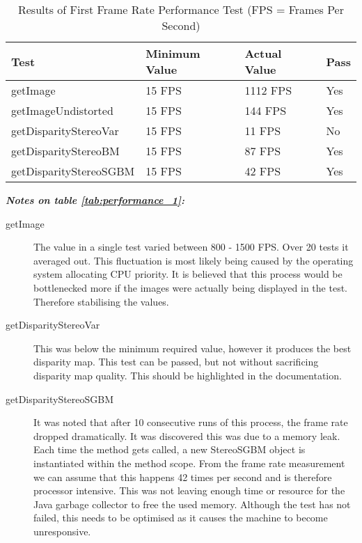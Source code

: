 \begin{table}[h]
\centering
\small
\begin{tabular}{llll}
\hline
\textbf{Test} & \textbf{Minimum Value} & \textbf{Actual Value} & \textbf{Pass}
\\ \hline
getImage                  & 15 FPS                 & 1112 FPS            & Yes           \\ 
getImageUndistorted       & 15 FPS                 & 144 FPS             & Yes           \\ 
getDisparityStereoVar     & 15 FPS                 & 11 FPS              & No            \\ 
getDisparityStereoBM      & 15 FPS                 & 87 FPS              & Yes           \\ 
getDisparityStereoSGBM    & 15 FPS                 & 42 FPS              & Yes           \\ \hline
\end{tabular}
\caption{Results of First Frame Rate Performance Test (FPS = Frames Per Second)\protect {\label{tab:performance_1}}}
\end{table}

\textbf{\textit{Notes on table \ref{tab:performance_1}:}}
\begin{description}
	\item[getImage] The value in a single test varied between 800 - 1500 FPS.
	Over 20 tests it averaged out.
	This fluctuation is most likely being caused by the operating system allocating CPU priority.
	It is believed that this process would be bottlenecked more if the images were actually being displayed in the test.
	Therefore stabilising the values.
	\item[getDisparityStereoVar] This was below the minimum required value, however it produces the best disparity map.
	This test can be passed, but not without sacrificing disparity map quality.
	This should be highlighted in the documentation.
	\item[getDisparityStereoSGBM] It was noted that after 10 consecutive runs of this process, the frame rate dropped dramatically.
	It was discovered this was due to a memory leak.
	Each time the method  gets called, a new StereoSGBM object is instantiated within the method scope. From the frame rate measurement we can assume that this happens 42 times per second and is therefore processor intensive. This was not leaving enough time or resource for the Java garbage collector to free the used memory. Although the test has not failed, this needs to be optimised as it causes the machine to become unresponsive.
	
\end{description}
